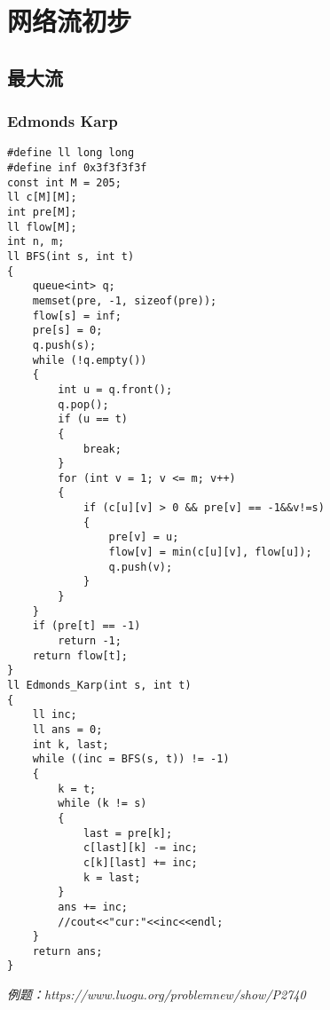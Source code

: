 \section{网络流初步}
\subsection{最大流}
\subsubsection{Edmonds Karp}
\begin{lstlisting}
#define ll long long
#define inf 0x3f3f3f3f
const int M = 205;
ll c[M][M];
int pre[M];
ll flow[M];
int n, m;
ll BFS(int s, int t)
{
    queue<int> q;
    memset(pre, -1, sizeof(pre));
    flow[s] = inf;
    pre[s] = 0;
    q.push(s);
    while (!q.empty())
    {
        int u = q.front();
        q.pop();
        if (u == t)
        {
            break;
        }
        for (int v = 1; v <= m; v++)
        {
            if (c[u][v] > 0 && pre[v] == -1&&v!=s)
            {
                pre[v] = u;
                flow[v] = min(c[u][v], flow[u]);
                q.push(v);
            }
        }
    }
    if (pre[t] == -1)
        return -1;
    return flow[t];
}
ll Edmonds_Karp(int s, int t)
{
    ll inc;
    ll ans = 0;
    int k, last;
    while ((inc = BFS(s, t)) != -1)
    {
        k = t;
        while (k != s)
        {
            last = pre[k];
            c[last][k] -= inc;
            c[k][last] += inc;
            k = last;
        }
        ans += inc;
        //cout<<"cur:"<<inc<<endl;
    }
    return ans;
}
\end{lstlisting}
\emph{例题：https://www.luogu.org/problemnew/show/P2740}

